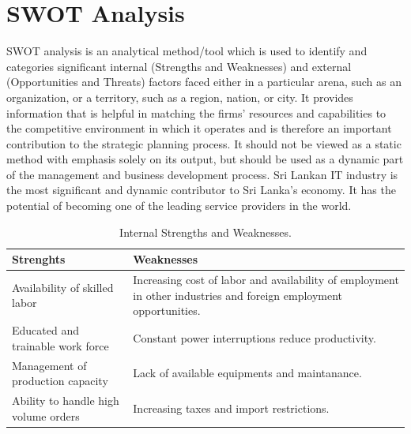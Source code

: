 \documentclass[twoside,12pt,times,onecolumn,a4paper]{report}
\begin{document}
\chapter{ SWOT Analysis }
\hspace{3em}SWOT analysis is an analytical method/tool which is used to identify and categories significant internal (Strengths and Weaknesses) and external (Opportunities and Threats) factors faced either in a particular arena, such as an organization, or a territory, such as a region, nation, or city.
It provides information that is helpful in matching the firms’ resources and capabilities to the competitive environment in which it operates and is therefore an important contribution to the strategic planning process. It should not be viewed as a static method with emphasis solely on its output, but should be used as a dynamic part of the management and business development process. Sri Lankan IT industry is the most significant and dynamic contributor to Sri Lanka’s economy. It has the potential of becoming one of the leading service providers in the world. 

\begin{table}[!h]
\centering


 \begin{tabular}{||p{}|p{}||}
 \hline
 Strenghts &  Weaknesses \\ [0.5ex] 
 \hline\hline
 Availability of skilled labor & Increasing cost of labor and availability of employment in other industries and foreign employment opportunities. \\ 
 \hline
 Educated and trainable work force & Constant power interruptions reduce productivity.  \\
 \hline
Management of production capacity  & Lack of available equipments and maintanance.  \\  
 \hline
Ability to handle high volume orders & Increasing taxes and import restrictions.  \\ [1ex]
\hline
 \end{tabular}
\caption{Internal Strengths and Weaknesses.}
\label{tab:table1}
\end{table}
\end{document}
